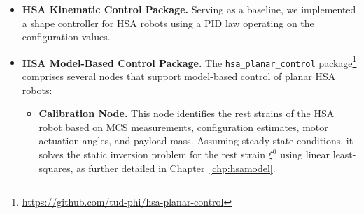 \begin{itemize}
    \item \textbf{HSA Kinematic Control Package.} Serving as a baseline, we implemented a shape controller for \gls{HSA} robots using a PID law operating on the configuration values.
    \item \textbf{HSA Model-Based Control Package.}
    The \texttt{hsa\_planar\_control} package\footnote{\url{https://github.com/tud-phi/hsa-planar-control}} comprises several nodes that support model-based control of planar \gls{HSA} robots:
    \begin{itemize}
        \item \textbf{Calibration Node.} This node identifies the rest strains of the \gls{HSA} robot based on \gls{MCS} measurements, configuration estimates, motor actuation angles, and payload mass. Assuming steady-state conditions, it solves the static inversion problem for the rest strain $\xi^0$ using linear least-squares, as further detailed in Chapter~\ref{chp:hsamodel}.

\end{itemize}
\end{itemize}
